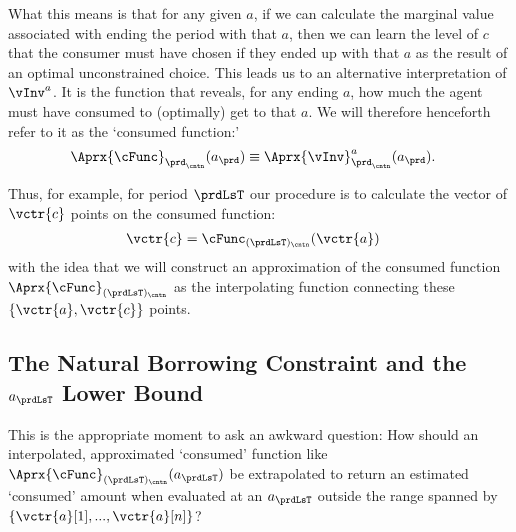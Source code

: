\documentclass[\econtexRoot/SolvingMicroDSOPs]{subfiles}
\begin{document}
What this means is that for any given $a$, if we can calculate the marginal value associated with ending the period with that $a$, then we can learn the level of $c$ that the consumer must have chosen if they ended up with that $a$ as the result of an optimal unconstrained choice.  This leads us to an alternative interpretation of $\vInv^{a}$. It is the function that reveals, for any ending $a$, how much the agent must have consumed to (optimally) get to that $a$.  We will therefore henceforth refer to it as the `consumed function:'
\begin{equation}\begin{gathered}\begin{aligned}
      \Aprx{\cFunc}_{\prd_\cntn}(a_{\prd}) & \equiv \Aprx{\vInv}^{a}_{\prd_\cntn}(a_{\prd}) \label{eq:consumedfn}.    
    \end{aligned}\end{gathered}\end{equation}

Thus, for example, for period $\prdLsT$ our procedure is to calculate the vector of $\vctr{c}$ points on the consumed function:
\begin{equation}\begin{gathered}\begin{aligned}
      \vctr{c} & = \cFunc_{(\prdLsT)_\cntn}(\vctr{a}) \label{eq:consumedfnvecs}     
    \end{aligned}\end{gathered}\end{equation}
with the idea that we will construct an approximation of the consumed function $\Aprx{\cFunc}_{(\prdLsT)_\cntn}$ as the interpolating function connecting these $\{\vctr{a},\vctr{c}\}$ points.

\hypertarget{the-natural-borrowing-constraint-and-the-a-lower-bound}{}
\subsection{The Natural Borrowing Constraint and the $a_{\prdLsT}$ Lower Bound} \label{subsec:LiqConstrSelfImposed}

This is the appropriate moment to ask an awkward question: How should an interpolated, approximated `consumed' function like $\Aprx{\cFunc}_{(\prdLsT)_\cntn}(a_{\prdLsT})$ be extrapolated to return an estimated `consumed' amount when evaluated at an $a_{\prdLsT}$ outside the range spanned by $\{\vctr{a}[1],...,\vctr{a}[n]\}$?
\end{document}
